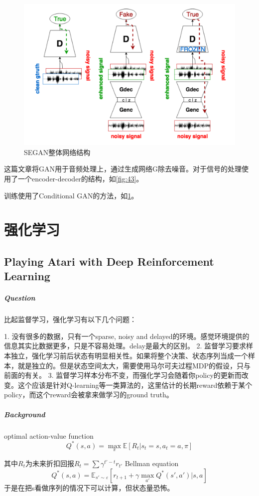 \documentclass[a4paper]{article}
\begin{document}
\begin{figure}
\centering
\includegraphics[width=\textwidth]{./img/42.png}
\caption{SEGAN整体网络结构}
\label{fig:42}
\end{figure}
这篇文章将GAN用于音频处理上，通过生成网络G除去噪音。对于信号的处理使用了一个encoder-decoder的结构，如\ref{fig:43}。

训练使用了Conditional GAN的方法，如\ref{fig:42}。
\section{强化学习}
\subsection{Playing Atari with Deep Reinforcement Learning\cite{DBLP:journals/corr/MnihKSGAWR13}}
\subparagraph{Question}
比起监督学习，强化学习有以下几个问题：

1. 没有很多的数据，只有一个sparse, noisy and delayed的环境。感觉环境提供的信息其实比数据更多，只是不容易处理。delay是最大的区别。
2. 监督学习要求样本独立，强化学习前后状态有明显相关性。如果将整个决策、状态序列当成一个样本，就是独立的。但是状态空间太大，需要使用马尔可夫过程MDP的假设，只与前面的有关。
3. 监督学习样本分布不变，而强化学习会随着你policy的更新而改变。这个应该是针对Q-learning等一类算法的，这里估计的长期reward依赖于某个policy，而这个reward会被拿来做学习的ground truth。

\subparagraph{Background}
optimal action-value function $$Q^*(s,a)=\max_\pi\mathbb{E}[R_t|s_t=s,a_t=a,\pi]$$

其中$R_t$为未来折扣回报$R_t=\sum \gamma^{t'-t}r_{t'}$
Bellman equation $$Q^*(s, a) = \mathbb{E}_{s'\sim \varepsilon}[r_{t+1} + \gamma\max\limits_{a'}Q^* (s',a')|s,a]$$
于是在把s看做序列的情况下可以计算，但状态量恐怖。
\end{document}
